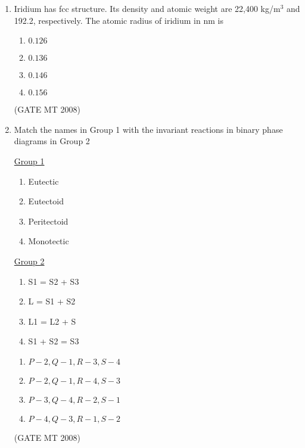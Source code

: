 \documentclass[11pt, letterpaper]{article}
\theoremstyle{remark}
\begin{document}
\begin{enumerate}[label=Q.\arabic*]
\item Iridium has fcc structure. Its density and atomic weight are 22,400 kg/m$^3$ and 192.2, respectively. The atomic radius of iridium in nm is
    \vspace{-0.9em}
    \begin{multicols}{4}
        \begin{enumerate}[label=(\MakeUppercase{\alph*})]
            \item $0.126$ 
            \item $0.136$ 
            \item $0.146$ 
            \item $0.156$
        \end{enumerate}
    \end{multicols}
    \vspace{-5mm}
\hfill(GATE MT 2008) 

\item Match the names in Group 1 with the invariant reactions in binary phase diagrams in Group 2
\begin{multicols}{2}
    \underline{Group 1}
    \begin{enumerate}[label=(\Alph*), start=16]
        \item Eutectic
        \item Eutectoid 
        \item Peritectoid
        \item Monotectic
    \end{enumerate}

     \underline{Group 2}
    \begin{enumerate}[label=(\arabic*), start=1]
        \item S1 = S2 + S3
        \item L = S1 + S2
        \item L1 = L2 + S
        \item S1 + S2 = S3
    \end{enumerate}
\end{multicols}
\vspace{-2em}
    \begin{multicols}{2}
        \begin{enumerate}[label=(\MakeUppercase{\alph*})]
            \item $P-2, Q-1, R-3, S-4$
            \item $P-2, Q-1, R-4, S-3$
            \item $P-3, Q-4, R-2, S-1$
            \item $P-4, Q-3, R-1, S-2$
        \end{enumerate}
    \end{multicols}
    \vspace{-5mm}
 \hfill(GATE MT 2008)
 

\end{enumerate}
\end{document}
